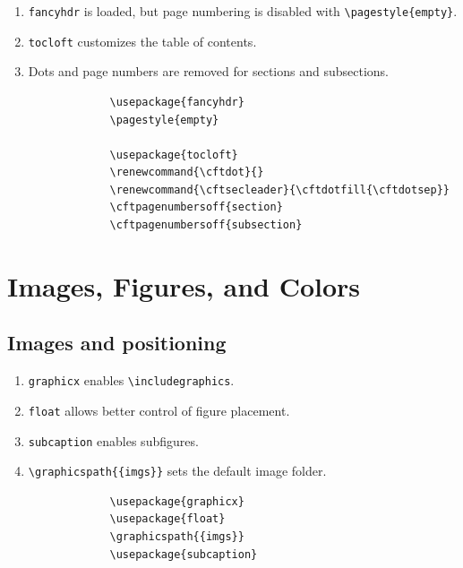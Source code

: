 \begin{minipage}{\anchoPag}
		\begin{enumerate}
			\item \texttt{fancyhdr} is loaded, but page numbering is disabled with \texttt{\textbackslash pagestyle\{empty\}}.
			\item \texttt{tocloft} customizes the table of contents.
			\item Dots and page numbers are removed for sections and subsections.
		\end{enumerate}
		
		\begin{mdframed}[style=code]
			\begin{verbatim}
				\usepackage{fancyhdr}
				\pagestyle{empty}
				
				\usepackage{tocloft}
				\renewcommand{\cftdot}{}
				\renewcommand{\cftsecleader}{\cftdotfill{\cftdotsep}}
				\cftpagenumbersoff{section}
				\cftpagenumbersoff{subsection}
			\end{verbatim}
		\end{mdframed}
		
		\section{Images, Figures, and Colors}\label{sec:images}
		
		\subsection{Images and positioning}
		
		\begin{enumerate}
			\item \texttt{graphicx} enables \texttt{\textbackslash includegraphics}.
			\item \texttt{float} allows better control of figure placement.
			\item \texttt{subcaption} enables subfigures.
			\item \texttt{\textbackslash graphicspath\{\{imgs\}\}} sets the default image folder.
		\end{enumerate}
		
		\begin{mdframed}[style=code]
			\begin{verbatim}
				\usepackage{graphicx}
				\usepackage{float}
				\graphicspath{{imgs}}
				\usepackage{subcaption}
			\end{verbatim}
		\end{mdframed}
		

\end{minipage}
